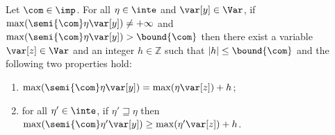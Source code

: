 \begin{lemma}\label{le:inc}
  Let \(\com\in \imp\).
  For all \(\eta \in \inte\) and \(\var[y] \in \Var\), if
  \(\max(\semi{\com} \eta \var[y]) \neq +\infty\) and
  \(\max(\semi{\com}\eta \var[y]) > \bound{\com}\) then there exist a
  variable \(\var[z] \in \Var\) and an integer \(h \in \mathbb{Z}\)
  such that \(|h| \leq \bound{\com}\) and the following two properties
  hold:
  \begin{enumerate}[label=(\roman*)]
  \item\label{point1} \(\max(\semi{\com}\eta \var[y]) = \max(\eta \var[z]) + h\); 
  \item\label{point2} for all \(\eta' \in \inte\), if \(\eta' \sqsupseteq \eta\)
    then
    \(\max(\semi{\com}\eta' \var[y]) \geq \max(\eta' \var[z]) + h\).
  \end{enumerate}
\end{lemma}

